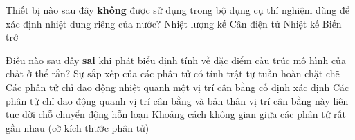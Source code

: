 \begin{ex}%
	Thiết bị nào sau đây \textbf{không} được sử dụng trong bộ dụng cụ thí nghiệm dùng để xác định nhiệt dung riêng của nước?
	\choice
	{Nhiệt lượng kế}
	{Cân điện tử}
	{Nhiệt kế}
	{\True Biến trở}
\end{ex}

\begin{ex}%
	Điều nào sau đây \textbf{sai} khi phát biểu định tính về đặc điểm cấu trúc mô hình của chất ở thể rắn?
	\choice
	{Sự sắp xếp của các phân tử có tính trật tự tuần hoàn chặt chẽ}
	{Các phân tử chỉ dao động nhiệt quanh một vị trí cân bằng cố định xác định}
	{\True Các phân tử chỉ dao động quanh vị trí cân bằng và bản thân vị trí cân bằng này liên tục dời chỗ chuyển động hỗn loạn}
	{Khoảng cách không gian giữa các phân tử rất gần nhau (cỡ kích thước phân tử)}
\end{ex}


